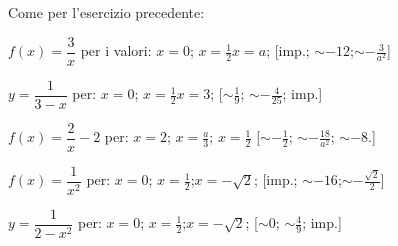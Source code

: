 \begin{esercizio} \label{ese:dif06}
Come per l'esercizio precedente:
\begin{enumeratea}
  \item  \(f(x)=\dfrac{3}{x}\) per i valori:\hspace{1.5em} \(x=0\);
  \hspace{1.5em}  \(x=\frac{1}{2}\)\hspace{1.5em}\(x=a\); 
  \hfill [imp.; \(\sim-12\);\(\sim -\frac{3}{a^2}\)]
 \item \(y=\dfrac{1}{3-x}\) per:\hspace{1.5em} \(x=0\);\hspace{1.5em}
  \(x=\frac{1}{2}\)\hspace{1.5em}\(x=3\);
   \hfill [\(\sim \frac{1}{9}\); \(\sim -\frac{4}{25}\); imp.]
  \item \(f(x)=\dfrac{2}{x}-2\) per:\hspace{1.5em} \(x=2\);\hspace{1.5em}
  \(x=\frac{a}{3}\);  \(x=\frac{1}{2}\) 
  \hfill [\(\sim -\frac{1}{2}\); \(\sim -\frac{18}{a^2}\); \(\sim -8\).]
  \item \(f(x)=\dfrac{1}{x^2}\) per:\hspace{1.5em} \(x=0\);\hspace{1.5em}
  \(x=\frac{1}{2}\);\hspace{1.5em}\(x=-\sqrt{2}\);
  \hfill [imp.; \(\sim-16\);\(\sim -\frac{\sqrt{2}}{2}\)]
  \item \(y=\dfrac{1}{2-x^2}\) per:\hspace{1.5em} \(x=0\);\hspace{1.5em}
  \(x=\frac{1}{2}\);\hspace{1.5em}\(x=-\sqrt{2}\);
   \hfill [\(\sim 0\); \(\sim \frac{4}{9}\); imp.]
 \end{enumeratea} 
\end{esercizio}
% 
